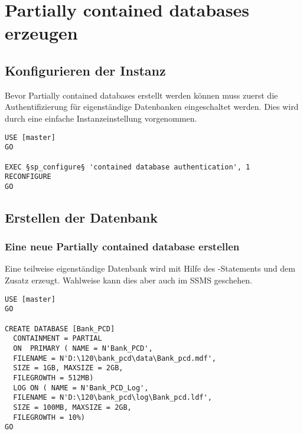       \section{Partially contained databases erzeugen}
        \subsection{Konfigurieren der Instanz}
          Bevor Partially contained databases erstellt werden können muss zuerst
          die Authentifizierung für eigenständige Datenbanken eingeschaltet
          werden. Dies wird durch eine einfache Instanzeinstellung vorgenommen.
          \begin{lstlisting}[language=ms_sql,caption={Eigen\-stän\-dige Daten\-banken
          aktivieren},label=sql20_01]
USE [master]
GO

EXEC §sp_configure§ 'contained database authentication', 1
RECONFIGURE
GO          
          \end{lstlisting}
        \subsection{Erstellen der Datenbank}
          \subsubsection{Eine neue Partially contained database erstellen}
            Eine teilweise eigenständige Datenbank wird mit Hilfe des
            -Statements und dem Zusatz
             erzeugt. Wahlweise kann dies
            aber auch im SSMS geschehen.
            \begin{lstlisting}[language=ms_sql,caption={Erstellen einer teilweise eigen\-stän\-digen Daten\-bank},label=sql20_02]
USE [master]
GO

CREATE DATABASE [Bank_PCD]
  CONTAINMENT = PARTIAL
  ON  PRIMARY ( NAME = N'Bank_PCD',
  FILENAME = N'D:\120\bank_pcd\data\Bank_pcd.mdf',
  SIZE = 1GB, MAXSIZE = 2GB,
  FILEGROWTH = 512MB)
  LOG ON ( NAME = N'Bank_PCD_Log',
  FILENAME = N'D:\120\bank_pcd\log\Bank_pcd.ldf',
  SIZE = 100MB, MAXSIZE = 2GB,
  FILEGROWTH = 10%)
GO
            \end{lstlisting}
